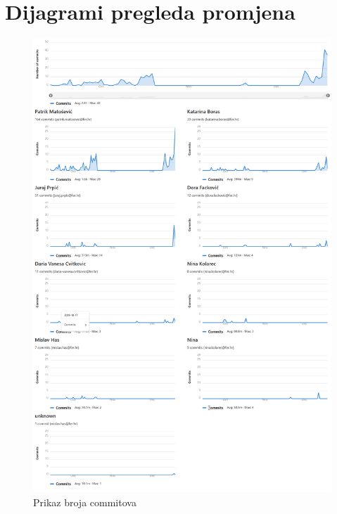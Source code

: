 					
		\eject
		\section*{Dijagrami pregleda promjena}
		
%		

\begin{figure}
	\centering
	\includegraphics[width=0.9\linewidth]{slike/contributions}
	\caption{Prikaz broja commitova}
	\label{fig:contributions}
\end{figure}



		
	